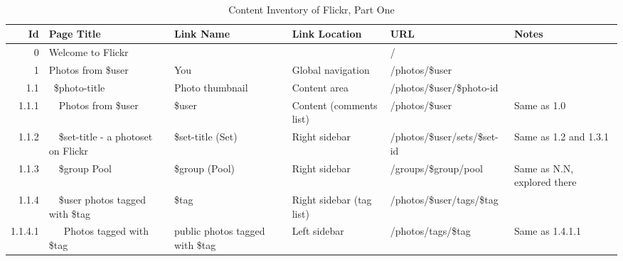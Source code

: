 \documentclass[12pt,a4paper]{article}
\begin{document}
\begin{landscape}
  \begin{table}[h!b!p!]
    \caption{Content Inventory of Flickr, Part One}
    \label{table:flickr.content.inventory.1}
    \begin{center}
      \begin{tiny}
        \tt
        \begin{tabular}{r|l|l|l|l|p{3cm}}
            Id &
            Page Title &
            Link Name &
            Link Location &
            URL &
            Notes \\

            \hline

            0 &
            Welcome to Flickr &
            &
            &
            / &
            \\

            1 &
            Photos from \$user &
            You &
            Global navigation &
            /photos/\$user &
            \\

              1.1 &
              ~\$photo-title &
              Photo thumbnail &
              Content area &
              /photos/\$user/\$photo-id &
              \\

                1.1.1 &
                ~~Photos from \$user &
                \$user &
                Content (comments list) &
                /photos/\$user &
                Same as 1.0\\

                1.1.2 &
                ~~\$set-title - a photoset on Flickr &
                \$set-title (Set) &
                Right sidebar &
                /photos/\$user/sets/\$set-id &
                Same as 1.2 and 1.3.1 \\

                1.1.3 &
                ~~\$group Pool &
                \$group (Pool) &
                Right sidebar &
                /groups/\$group/pool &
                Same as N.N, explored there \\

                1.1.4 &
                ~~\$user photos tagged with \$tag &
                \$tag &
                Right sidebar (tag list) &
                /photos/\$user/tags/\$tag &
                \\

                  1.1.4.1 &
                  ~~~Photos tagged with \$tag &
                  public photos tagged with \$tag &
                  Left sidebar &
                  /photos/tags/\$tag &
                  Same as 1.4.1.1 \\


\end{tabular}
\end{tiny}
\end{center}
\end{table}
\end{landscape}
\end{document}
